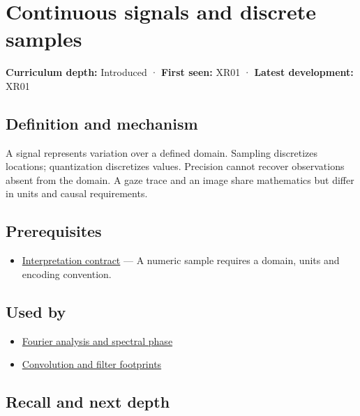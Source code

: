 \hypertarget{appendix-1077ea8fc737}{}\label{referencestart:appendix-1077ea8fc737}
\section{Continuous signals and discrete samples}\label{appendix-1077ea8fc737-continuous-signals-and-discrete-samples}

\textbf{Curriculum depth:} Introduced · \textbf{First seen:} XR01 · \textbf{Latest development:} XR01

\subsection{Definition and mechanism}\label{appendix-1077ea8fc737-definition-and-mechanism}

A signal represents variation over a defined domain. Sampling discretizes locations; quantization discretizes values. Precision cannot recover observations absent from the domain. A gaze trace and an image share mathematics but differ in units and causal requirements.

\subsection{Prerequisites}\label{appendix-1077ea8fc737-prerequisites}

\begin{itemize}
\tightlist
\item
  \hyperref[appendix-f414bd4ed05c]{Interpretation contract} --- A numeric sample requires a domain, units and encoding convention.
\end{itemize}

\subsection{Used by}\label{appendix-1077ea8fc737-used-by}

\begin{itemize}
\tightlist
\item
  \hyperref[appendix-b60686ba06a1]{Fourier analysis and spectral phase}
\item
  \hyperref[appendix-d5b3c692d9f0]{Convolution and filter footprints}
\end{itemize}

\subsection{Recall and next depth}\label{appendix-1077ea8fc737-recall-and-next-depth}

